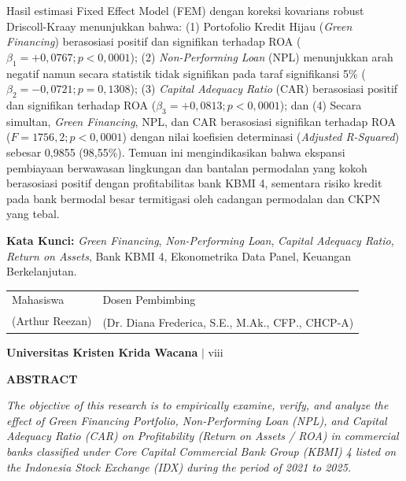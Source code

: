 \documentclass[12pt,a4paper]{article}
\newcommand{\ukrida}{Universitas Kristen Krida Wacana}
\newcommand{\nahamahasiswa}{Arthur Reezan}
\newcommand{\dosbim}{Dr. Diana Frederica, S.E., M.Ak., CFP\textsuperscript{\textregistered}., CHCP-A}
\numberwithin{equation}{section}
\begin{document}
\noindent
Hasil estimasi Fixed Effect Model (FEM) dengan koreksi kovarians robust Driscoll-Kraay menunjukkan bahwa: (1) Portofolio Kredit Hijau (\emph{Green Financing}) berasosiasi positif dan signifikan terhadap ROA ($\beta_1 = +0{,}0767; p < 0{,}0001$); (2) \emph{Non-Performing Loan} (NPL) menunjukkan arah negatif namun secara statistik tidak signifikan pada taraf signifikansi 5\% ($\beta_2 = -0{,}0721; p = 0{,}1308$); (3) \emph{Capital Adequacy Ratio} (CAR) berasosiasi positif dan signifikan terhadap ROA ($\beta_3 = +0{,}0813; p < 0{,}0001$); dan (4) Secara simultan, \emph{Green Financing}, NPL, dan CAR berasosiasi signifikan terhadap ROA ($F = 1756{,}2; p < 0{,}0001$) dengan nilai koefisien determinasi (\emph{Adjusted R-Squared}) sebesar 0,9855 (98,55\%). Temuan ini mengindikasikan bahwa ekspansi pembiayaan berwawasan lingkungan dan bantalan permodalan yang kokoh berasosiasi positif dengan profitabilitas bank KBMI 4, sementara risiko kredit pada bank bermodal besar termitigasi oleh cadangan permodalan dan CKPN yang tebal.

\vspace{0.4cm}
\noindent
\textbf{Kata Kunci:} \emph{Green Financing}, \emph{Non-Performing Loan}, \emph{Capital Adequacy Ratio}, \emph{Return on Assets}, Bank KBMI 4, Ekonometrika Data Panel, Keuangan Berkelanjutan.

\vspace{0.8cm}
\begin{tabular}{p{6cm} p{6cm}}
  Mahasiswa & Dosen Pembimbing \\[2.2cm]
  (\nahamahasiswa) & (\dosbim) \\
\end{tabular}

\vfill
\begin{flushright}
  \footnotesize\textbf{\ukrida} $|$ viii
\end{flushright}

\newpage
\thispagestyle{frontmatter}
\begin{center}
  {\large\bfseries ABSTRACT}
\end{center}

\vspace{0.4cm}
\noindent
\emph{The objective of this research is to empirically examine, verify, and analyze the effect of Green Financing Portfolio, Non-Performing Loan (NPL), and Capital Adequacy Ratio (CAR) on Profitability (Return on Assets / ROA) in commercial banks classified under Core Capital Commercial Bank Group (KBMI) 4 listed on the Indonesia Stock Exchange (IDX) during the period of 2021 to 2025.}
\end{document}
